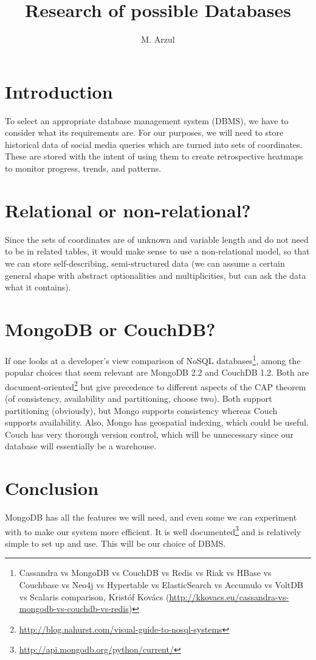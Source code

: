 \documentclass{article}
\title{Research of possible Databases}
\author{M. Arzul}
\date{}
\begin{document}
\maketitle
\tableofcontents
\newpage

\section{Introduction}

To select an appropriate database management system (DBMS), we have to consider what its requirements are. For our purposes, we will need to store historical data of social media queries which are turned into sets of coordinates. These are stored with the intent of using them to create retrospective heatmaps to monitor progress, trends, and patterns.

\section{Relational or non-relational?}

Since the sets of coordinates are of unknown and variable length and do not need to be in related tables, it would make sense to use a non-relational model, so that we can store self-describing, semi-structured data (we can assume a certain general shape with abstract optionalities and multiplicities, but can ask the data what it contains).

\section{MongoDB or CouchDB?}

If one looks at a developer's view comparison of NoSQL databases\footnote{Cassandra vs MongoDB vs CouchDB vs Redis vs Riak vs HBase vs Couchbase vs Neo4j vs Hypertable vs ElasticSearch vs Accumulo vs VoltDB vs Scalaris comparison, Krist\'{o}f Kov\'{acs} (\url{http://kkovacs.eu/cassandra-vs-mongodb-vs-couchdb-vs-redis})}, among the popular choices that seem relevant are MongoDB 2.2 and CouchDB 1.2. Both are document-oriented\footnote{\url{http://blog.nahurst.com/visual-guide-to-nosql-systems}} but give precedence to different aspects of the CAP theorem (of consistency, availability and partitioning, choose two). Both support partitioning (obviously), but Mongo supports consistency whereas Couch supports availability. Also, Mongo has geospatial indexing, which could be useful. Couch has very thorough version control, which will be unnecessary since our database will essentially be a warehouse.

\section{Conclusion}

MongoDB has all the features we will need, and even some we can experiment with to make our system more efficient. It is well documented\footnote{\url{http://api.mongodb.org/python/current/}} and is relatively simple to set up and use. This will be our choice of DBMS.
\end{document}
